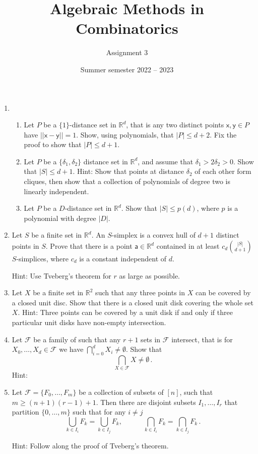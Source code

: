 \documentclass[kulak]{tplt}
\title{Algebraic Methods in Combinatorics}
\author{Assignment 3}
\date{Summer semester 2022 -- 2023}
\theoremstyle{definition}
\newcommand{\R}{\mathbb{R}}
\newcommand{\FF}{\mathcal F}
\newcommand{\vx}{\mathsf{x}}
\newcommand{\vy}{\mathsf{y}}
\newcommand{\va}{\mathsf{a}}
\begin{document}
\maketitle
\begin{enumerate}
\item 

\begin{enumerate}
\item  Let $P$ be a $\{1\}$-distance set in $\R^d$, that is any two distinct points $\vx, \vy \in P $ have $||\vx - \vy || = 1$.
Show, using polynomials, that $|P| \leq d+2$.
Fix the proof to show that $|P| \leq d+1$.

\item Let $P$ be a $\{\delta_1, \delta_2\}$ distance set in $\R^d $, and assume that $\delta_1> 2 \delta_2 > 0$.
Show that $|S| \leq d+1$.
Hint: Show that points at distance $\delta_2$ of each other form cliques, then show that a collection of polynomials of degree two is linearly independent.

\item Let $P$ be a $D$-distance set in $\R^d$.
Show that $|S| \leq p(d)$, where $p$ is a polynomial with degree $|D|$.
\end{enumerate}

\item Let $S$ be a finite set in $\R^d$.
An $S$-simplex is a convex hull of $d+1$ distinct points in $S$.
Prove that there is a point $\va \in \R^d$ contained in at least $c_d \binom{|S|}{d+1}$ $S$-simplices, where $c_d$ is a constant independent of $d$.

Hint: Use Tveberg's theorem for $r$ as large as possible.


\item Let $X$ be a finite set in $\R^2$ such that any three points in $X$ can be covered by a closed unit disc.
Show that there is a closed unit disk covering the whole set $X$.
Hint: Three points can be covered by a unit disk if and only if three particular unit disks have non-empty intersection.


\item Let $\mathcal F $ be a family of such that any $r+1$ sets in $\FF $ intersect, that is for $X_0, \ldots, X_d \in \FF $ we have $\bigcap_{i=0}^d X_i \neq \emptyset$.
Show that 
$$ \bigcap_{X \in \FF} X \neq \emptyset \, . $$
Hint: 

\item Let $\FF = \{ F_0, \ldots, F_m\}$ be a collection of subsets of $[n]$, such that $m \geq (n+1)(r-1)+1$.
Then there are disjoint subsets $I_1, \ldots , I_r$ that partition $\{0, \ldots, m\}$ such that for any $i\neq j$
$$ \bigcup_{k \in I_i} F_k = \bigcup_{k \in I_j} F_k , \quad \quad \quad \bigcap_{k \in I_i} F_k = \bigcap_{k \in I_j} F_k \, .$$

Hint: Follow along the proof of Tveberg's theorem.

\end{enumerate}
\end{document}
